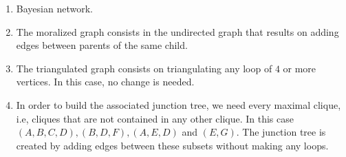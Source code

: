 \documentclass[11pt]{article}
\theoremstyle{definition}
\begin{document}
\begin{enumerate}
    \item Bayesian network.
    \begin{figure}[H]
        \centering
    \end{figure}
    \item The moralized graph consists in the undirected graph that results on adding edges between parents of the same child. 
    \begin{figure}[H]
        \centering
    \end{figure}
    \item The triangulated graph consists on triangulating any loop of \( 4 \) or more vertices. In this case, no change is needed.
    \item In order to build the associated junction tree, we need every maximal clique, i.e, cliques that are not contained in any other clique. In this case \( (A,B,C,D), (B,D,F), (A,E,D) \) and \( (E,G) \). The junction tree is created by adding edges between these subsets without making any loops.
    \begin{figure}[H]
        \centering
    \begin{tikzpicture}
    

\end{tikzpicture}
\end{figure}
\end{enumerate}
\end{document}
